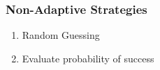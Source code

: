 \documentclass{beamer}
\begin{document}
    \begin{frame}
    \frametitle{Non-Adaptive Strategies}
    	\begin{enumerate}[label=\roman*.]
		\item Random Guessing
		\item Evaluate probability of success
		\end{enumerate}
    \end{frame}
    
    
\end{document}

